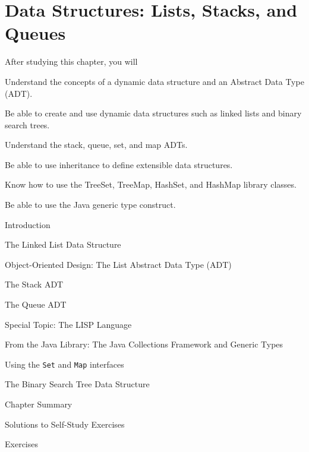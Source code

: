 

\setcounter{SSTUDYcount}{1}
\setcounter{chapter}{15}

\chapter{Data Structures: Lists, Stacks, and Queues}
\label{chapter-datastructures}



\CObegin
{}
\label{objectives}
\noindent After studying this chapter, you will

\begin{COBL}
\item  Understand the concepts of a dynamic data structure and an 
Abstract Data Type (ADT).
\item  Be able to create and use dynamic data structures
such as linked lists and binary search trees.
\item  Understand the stack, queue, set, and map ADTs.
\item  Be able to use inheritance to define extensible data structures.
\item  Know how to use the TreeSet, TreeMap, HashSet, and HashMap 
library classes.
\item  Be able to use the Java generic type construct.
\end{COBL}

\label{outline}
\begin{COL}
\item  {Introduction}
\item  {The Linked List Data Structure}
\item  {Object-Oriented Design: The List Abstract Data Type (ADT)}
\item  {The Stack ADT}
\item  {The Queue ADT}
\item[] {{\color{cyan}Special Topic:}  The LISP Language}
\item {From the Java Library: The Java Collections Framework and Generic Types}
\item {Using the {\tt Set} and {\tt Map} interfaces}
\item {The Binary Search Tree Data Structure}
\par\small\item[] {Chapter Summary}
\par\small\item[] {Solutions to Self-Study Exercises}
\par\small\item[] {Exercises}
\end{COL}
\COend


